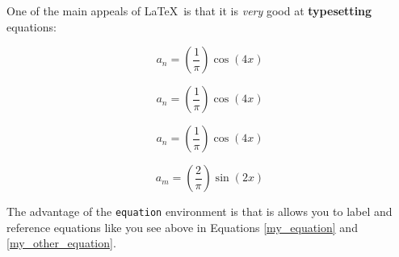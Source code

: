 \documentclass[12pt,letterpaper]{article}
\begin{document}
One of the main appeals of \LaTeX\ is that it is \textit{very} good at
\textbf{typesetting} equations:

\[
a_n = \left(\frac{1}{\pi}\right)\cos(4x)
\]

$$
a_n = \left(\frac{1}{\pi}\right)\cos(4x)
$$

\begin{equation}
a_n = \left(\frac{1}{\pi}\right)\cos(4x)
\label{my_equation}
\end{equation}

\begin{equation}
a_m = \left(\frac{2}{\pi}\right)\sin(2x)
\label{my_other_equation}
\end{equation}

The advantage of the \texttt{equation} environment is that is allows 
you to label and reference equations like you see above in Equations 
\ref{my_equation} and \ref{my_other_equation}.

\end{document}
